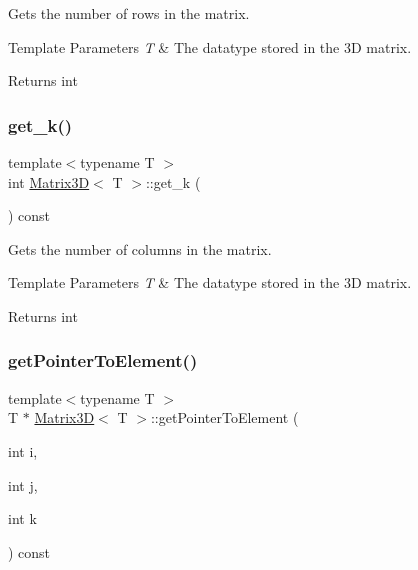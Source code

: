 Gets the number of rows in the matrix. 


\begin{DoxyTemplParams}{Template Parameters}
{\em T} & The datatype stored in the 3D matrix. \\
\hline
\end{DoxyTemplParams}
\begin{DoxyReturn}{Returns}
int 
\end{DoxyReturn}
\mbox{\label{classMatrix3D_a35fad9c3c81914e0ef5ed40ceda5d324}} 
\subsubsection{\texorpdfstring{get\+\_\+k()}{get\_k()}}
{\footnotesize\ttfamily template$<$typename T $>$ \\
int \mbox{\hyperlink{classMatrix3D}{Matrix3D}}$<$ T $>$\+::get\+\_\+k (\begin{DoxyParamCaption}{ }\end{DoxyParamCaption}) const}



Gets the number of columns in the matrix. 


\begin{DoxyTemplParams}{Template Parameters}
{\em T} & The datatype stored in the 3D matrix. \\
\hline
\end{DoxyTemplParams}
\begin{DoxyReturn}{Returns}
int 
\end{DoxyReturn}
\mbox{\label{classMatrix3D_ac21cf8967053b928f609b98abf1616e2}} 
\subsubsection{\texorpdfstring{get\+Pointer\+To\+Element()}{getPointerToElement()}}
{\footnotesize\ttfamily template$<$typename T $>$ \\
T $\ast$ \mbox{\hyperlink{classMatrix3D}{Matrix3D}}$<$ T $>$\+::get\+Pointer\+To\+Element (\begin{DoxyParamCaption}\item[{int}]{i,  }\item[{int}]{j,  }\item[{int}]{k }\end{DoxyParamCaption}) const}



